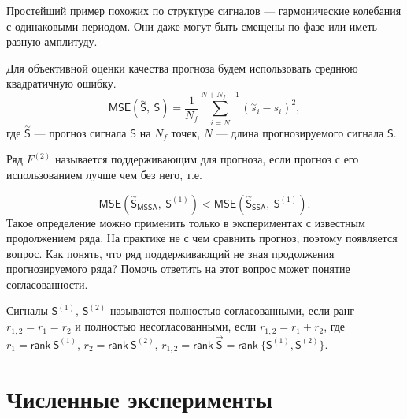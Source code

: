 \documentclass[specialist, substylefile = spbureport.rtx,
    subf,href,colorlinks=true, 12pt]{disser}
\newtheorem*{example}{Пример}
\newcommand{\rank}{\mathsf{rank}\ }
\newcommand{\sfS}{\mathsf{S}}
\newcommand{\MS}{\vec{\sfS}}
\newcommand{\MSE}{\mathsf{MSE}}
\newcommand{\SSA}{\mathsf{SSA}}
\newcommand{\MSSA}{\mathsf{MSSA}}
\begin{document}
        Простейший пример похожих по структуре сигналов --- гармонические колебания с одинаковыми периодом. Они даже могут быть смещены по фазе или иметь разную амплитуду.

        Для объективной оценки качества прогноза будем использовать среднюю квадратичную ошибку.
        $$\mathsf{MSE(\overset{\sim}{S},\ S)} = \frac{1}{N_{f}} \sum_{i = N}^{N + N_{f} - 1} (\overset{\sim}{s}_i - s_i)^2,$$
        где $\overset{\sim}{\sfS}$ --- прогноз сигнала $\sfS$ на $N_{f}$ точек, $N$ --- длина прогнозируемого сигнала $\sfS$.
    

        Ряд $F^{(2)}$ называется поддерживающим для прогноза, если прогноз с его использованием лучше чем без него, т.е.
    
        $$\MSE(\overset{\sim}{\sfS}_{\MSSA},\ \sfS^{(1)}) < \MSE(\overset{\sim}{\sfS}_{\SSA},\ \sfS^{(1)}).$$
        Такое определение можно применить только в экспериментах с известным продолжением ряда. На практике не с чем сравнить прогноз, поэтому появляется вопрос. Как понять, что ряд поддерживающий не зная продолжения прогнозируемого ряда? Помочь ответить на этот вопрос может понятие согласованности.

        Сигналы $\sfS^{(1)}$, $\sfS^{(2)}$ называются полностью согласованными, если ранг $r_{1,2} = r_1 = r_2$ и полностью несогласованными, если $r_{1,2} = r_1 + r_2$, где $r_1 = \rank \sfS^{(1)}$, $r_2 = \rank \sfS^{(2)}$, $r_{1,2} = \rank \MS = \rank \{\sfS^{(1)}, \sfS^{(2)}\}.$



    \chapter{Численные эксперименты}
        
\end{document}
